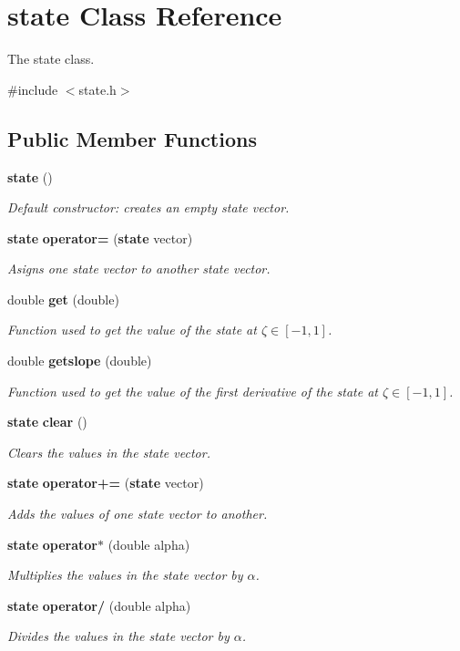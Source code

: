 \section{state Class Reference}
\label{classstate}


The state class.  




{\ttfamily \#include $<$state.\-h$>$}

\subsection*{Public Member Functions}
\begin{DoxyCompactItemize}
\item 
{\bf state} ()
\begin{DoxyCompactList}\small\item\em Default constructor\-: creates an empty state vector. \end{DoxyCompactList}\item 
{\bf state} {\bf operator=} ({\bf state} vector)
\begin{DoxyCompactList}\small\item\em Asigns one state vector to another state vector. \end{DoxyCompactList}\item 
double {\bf get} (double)
\begin{DoxyCompactList}\small\item\em Function used to get the value of the state at $\zeta \in [-1,1]$. \end{DoxyCompactList}\item 
double {\bf getslope} (double)
\begin{DoxyCompactList}\small\item\em Function used to get the value of the first derivative of the state at $\zeta \in [-1,1]$. \end{DoxyCompactList}\item 
{\bf state} {\bf clear} ()
\begin{DoxyCompactList}\small\item\em Clears the values in the state vector. \end{DoxyCompactList}\item 
{\bf state} {\bf operator+=} ({\bf state} vector)
\begin{DoxyCompactList}\small\item\em Adds the values of one state vector to another. \end{DoxyCompactList}\item 
{\bf state} {\bf operator$\ast$} (double alpha)
\begin{DoxyCompactList}\small\item\em Multiplies the values in the state vector by $ \alpha $. \end{DoxyCompactList}\item 
{\bf state} {\bf operator/} (double alpha)
\begin{DoxyCompactList}\small\item\em Divides the values in the state vector by $ \alpha $. \end{DoxyCompactList}\end{DoxyCompactItemize}
